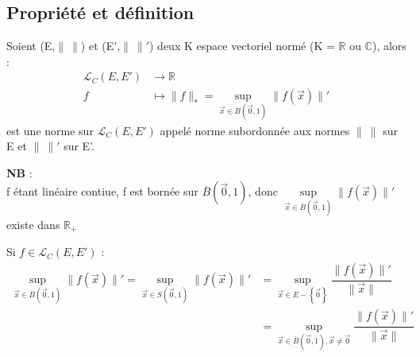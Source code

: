 \subsection{Propriété et définition}
\begin{de}
Soient (E,$\parallel~ \parallel$) et (E',$\parallel~\parallel'$) deux K espace vectoriel normé (K = $\mathbb{R}$ ou $\mathbb{C}$), alors : 
\begin{align*}
\mathcal{L}_C(E,E') &\rightarrow \mathbb{R} \\
f &\mapsto \parallel f\parallel_* = \underset{\overrightarrow{x} \in \overline{B}(\overrightarrow{0},1)}\sup \parallel f(\overrightarrow{x}) \parallel'
\end{align*}
est une norme sur $\mathcal{L}_C(E,E')$ appelé norme subordonnée aux normes $\parallel~\parallel$ sur E et $\parallel~\parallel'$ sur E'.
\end{de}
\textbf{NB} :\\
f étant linéaire contiue, f est bornée sur $\overline{B}(\overrightarrow{0},1)$, donc  $\underset{\overrightarrow{x} \in \overline{B}(\overrightarrow{0},1)}\sup \parallel f(\overrightarrow{x}) \parallel'$ existe dans $\mathbb{R}_+$
\begin{prop}
Si $f \in \mathcal{L}_C(E,E')$ : \\
\begin{align*}
\underset{\overrightarrow{x} \in \overline{B}(\overrightarrow{0},1)}\sup \parallel f(\overrightarrow{x}) \parallel' = \underset{\overrightarrow{x} \in S(\overrightarrow{0},1)}\sup \parallel f(\overrightarrow{x}) \parallel' & = \underset{\overrightarrow{x} \in E - \left\lbrace \overrightarrow{0}\right\rbrace}\sup \dfrac{\parallel f(\overrightarrow{x})\parallel'}{\parallel \overrightarrow{x}\parallel} \\
         &= \underset{\overrightarrow{x} \in \overline{B}(\overrightarrow{0},1), \overrightarrow{x} \neq \overrightarrow{0}}\sup \dfrac{\parallel f(\overrightarrow{x})\parallel'}{\parallel \overrightarrow{x}\parallel}
\end{align*}
\end{prop}

